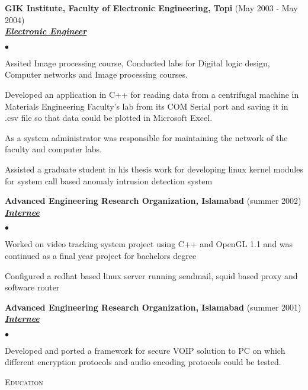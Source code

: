 \documentclass{article}
\newcommand{\lineunder}{\vspace*{-8pt} \\ \hspace*{-18pt} \hrulefill \\}
\newcommand{\header}[1]{{\hspace*{-15pt}\vspace*{6pt} \textsc{#1}} \vspace*{-6pt} \lineunder}
\newcommand{\employer}[3]{{ \textbf{#1} (#2)\\ \underline{\textbf{\emph{#3}}}\\  }}
\newenvironment{achievements}{\begin{list}{$\bullet$}{\topsep 0pt \itemsep -2pt}}{\vspace*{4pt}\end{list}}
\begin{document}
\employer{GIK Institute, Faculty of Electronic Engineering, Topi}{May 2003 - May 2004}{Electronic Engineer}
	\begin{achievements}
	\item Assited Image processing course, Conducted labs for Digital logic design, Computer networks and Image processing courses.
	\item Developed an application in C++ for reading data from a centrifugal machine in Materials Engineering Faculty’s lab from its COM Serial port and saving it in .csv file so that data could be plotted in Microsoft Excel.
	\item As a system administrator was responsible for maintaining the network of the faculty and computer labs.
	\item Assisted a graduate student in his thesis work for developing linux kernel modules for system call based anomaly intrusion detection system
	\end{achievements}

\employer{Advanced Engineering Research Organization, Islamabad}{summer 2002}{Internee}
	\begin{achievements}
	\item Worked on video tracking system project using C++ and OpenGL 1.1 and was continued as a final year project for bachelors degree
	\item Configured a redhat based linux server running sendmail, squid based proxy and software router
	\end{achievements}

\employer{Advanced Engineering Research Organization, Islamabad}{summer 2001}{Internee}
	\begin{achievements}
	\item Developed and ported a framework for secure VOIP solution to PC on which different encryption protocols and audio encoding protocols could be tested.
	\end{achievements}

\header{Education}
\end{document}
